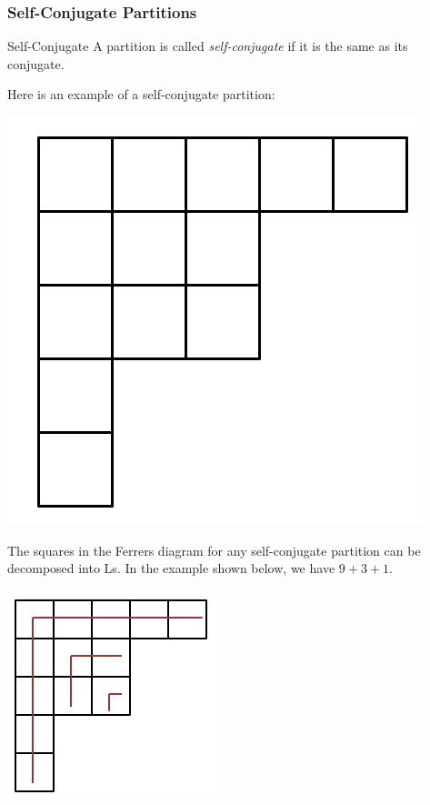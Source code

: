 \documentclass[letterpaper]{article}
\begin{document}
\subsubsection{Self-Conjugate Partitions}
\begin{definition}{Self-Conjugate}{}
    A partition is called \emph{self-conjugate} if it is the same as its conjugate. 
\end{definition}
Here is an example of a self-conjugate partition:
\begin{center}
    \includegraphics[scale=0.3]{img/self_c.PNG}
\end{center}
The squares in the Ferrers diagram for any self-conjugate partition can be decomposed into Ls. In the example shown below, we have $9 + 3 + 1$. 
\begin{center}
    \includegraphics[scale=0.8]{img/self_c_L.PNG}
\end{center}
 
\end{document}
